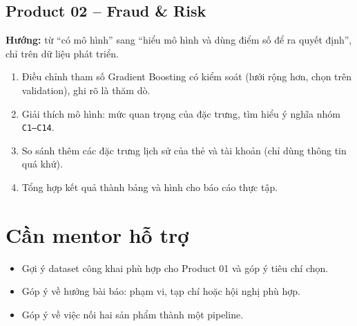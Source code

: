 \documentclass[11pt,a4paper]{article}
\begin{document}
\subsection*{Product 02 – Fraud \& Risk}

\textbf{Hướng:} từ “có mô hình” sang “hiểu mô hình và dùng điểm số để ra quyết định”, chỉ trên dữ liệu
phát triển.
\begin{enumerate}
  \item Điều chỉnh tham số Gradient Boosting có kiểm soát (lưới rộng hơn, chọn trên validation), ghi rõ
        là thăm dò.
  \item Giải thích mô hình: mức quan trọng của đặc trưng, tìm hiểu ý nghĩa nhóm \texttt{C1–C14}.
  \item So sánh thêm các đặc trưng lịch sử của thẻ và tài khoản (chỉ dùng thông tin quá khứ).
  \item Tổng hợp kết quả thành bảng và hình cho báo cáo thực tập.
\end{enumerate}

\section{Cần mentor hỗ trợ}

\begin{itemize}
  \item Gợi ý dataset công khai phù hợp cho Product 01 và góp ý tiêu chí chọn.
  \item Góp ý về hướng bài báo: phạm vi, tạp chí hoặc hội nghị phù hợp.
  \item Góp ý về việc nối hai sản phẩm thành một pipeline.
\end{itemize}
\end{document}
